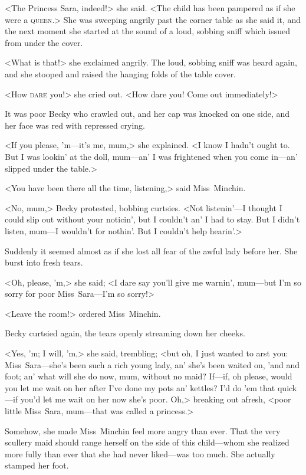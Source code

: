 <The Princess Sara, indeed!> she said. <The child has been pampered as if she were a \textsc{queen}.> She was sweeping angrily past the corner table as she said it, and the next moment she started at the sound of a loud, sobbing sniff which issued from under the cover.

<What is that!> she exclaimed angrily. The loud, sobbing sniff was heard again, and she stooped and raised the hanging folds of the table cover.

<How \textsc{dare} you!> she cried out. <How dare you! Come out immediately!>

It was poor Becky who crawled out, and her cap was knocked on one side, and her face was red with repressed crying.

<If you please, 'm—it's me, mum,> she explained. <I know I hadn't ought to. But I was lookin' at the doll, mum—an' I was frightened when you come in—an' slipped under the table.>

<You have been there all the time, listening,> said Miss~Minchin.

<No, mum,> Becky protested, bobbing curtsies. <Not listenin'—I thought I could slip out without your noticin', but I couldn't an' I had to stay. But I didn't listen, mum—I wouldn't for nothin'. But I couldn't help hearin'.>

Suddenly it seemed almost as if she lost all fear of the awful lady before her. She burst into fresh tears.

<Oh, please, 'm,> she said; <I dare say you'll give me warnin', mum—but I'm so sorry for poor Miss~Sara—I'm so sorry!>

<Leave the room!> ordered Miss~Minchin.

Becky curtsied again, the tears openly streaming down her cheeks.

<Yes, 'm; I will, 'm,> she said, trembling; <but oh, I just wanted to arst you: Miss~Sara—she's been such a rich young lady, an' she's been waited on, 'and and foot; an' what will she do now, mum, without no maid? If—if, oh please, would you let me wait on her after I've done my pots an' kettles? I'd do 'em that quick—if you'd let me wait on her now she's poor. Oh,> breaking out afresh, <poor little Miss~Sara, mum—that was called a princess.>

Somehow, she made Miss~Minchin feel more angry than ever. That the very scullery maid should range herself on the side of this child—whom she realized more fully than ever that she had never liked—was too much. She actually stamped her foot.

